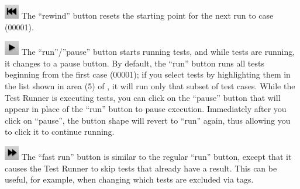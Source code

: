 \documentclass{sbmlpkgspec}
\begin{document}
\begin{description}[style=multiline,leftmargin=0.4in]

\item {\hspace*{-0.4in}\includegraphics[width = 0.25in]{figs/rewind-button}\hspace*{0.1in}} The ``rewind'' button resets the starting point for the next run to case (00001).

\item {\hspace*{-0.4in}\includegraphics[width = 0.25in]{figs/play-button}\hspace*{0.1in}} The ``run''/''pause'' button starts running tests, and while tests are running, it changes to a pause button.  By default, the ``run'' button runs all tests beginning from the first case (00001); if you select tests by highlighting them in the list shown in area (5) of , it will run only that subset of test cases.  While the Test Runner is executing tests, you can click on the ``pause'' button that will appear in place of the ``run'' button to pause execution.  Immediately after you click on ``pause'', the button shape will revert to ``run'' again, thus allowing you to click it to continue running.

\item  {\hspace*{-0.4in}\includegraphics[width = 0.25in]{figs/fast-play-button}\hspace*{0.1in}} The ``fast run'' button is similar to the regular ``run'' button, except that it causes the Test Runner to skip tests that already have a result.  This can be useful, for example, when changing which tests are excluded via tags.


\end{description}




\end{document}
